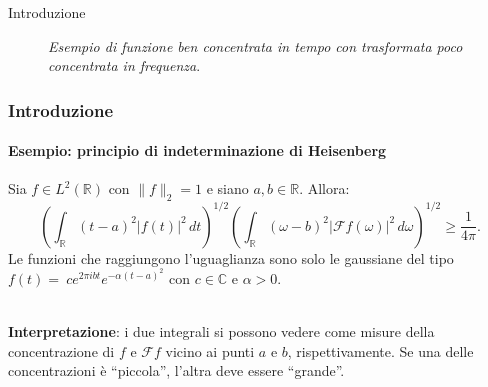 \documentclass[aspectratio=141]{beamer}
\newcommand{\R}{\mathbb{R}} %
\newcommand{\F}{\mathscr{F}} %
\newcommand{\C}{\mathbb{C}} %
\newcommand{\emptyline}{\phantom{ }\\}
\begin{document}
\begin{section}{Introduzione}
\begin{frame}
\begin{center}
\begin{figure}
{}
			\caption{ {\footnotesize \textit{Esempio di funzione ben concentrata in tempo con trasformata poco concentrata in frequenza}}.}
			\end{figure}
		\end{center}
	\end{frame}

	\begin{frame}
		\frametitle{Introduzione}
		\framesubtitle{Esempio: principio di indeterminazione di Heisenberg}
		\begin{myblock}
			Sia $f \in L^2(\R)$ con $\|f\|_2 = 1$ e siano $a,b \in \R$. Allora:
			\begin{equation}
				\left(\int_{\R} (t-a)^2 |f(t)|^2 \, dt\right)^{1/2} \left(\int_{\R} (\omega-b)^2 |\F f(\omega)|^2 \, d\omega	\right)^{1/2} \geq \dfrac{1}{4 \pi}.
			\end{equation}
			Le funzioni che raggiungono l'uguaglianza sono solo le gaussiane del tipo $f(t)=~c e^{2 \pi i b t} e^{-\alpha (t-a)^2}$ con $c \in \C$ e $\alpha > 0$.
		\end{myblock}
		\emptyline
		\textbf{Interpretazione}: i due integrali si possono vedere come misure della concentrazione di $f$ e $\F f$ vicino ai punti $a$ e $b$, rispettivamente. Se una delle concentrazioni è ``piccola'', l'altra deve essere ``grande''.\\
	\end{frame}
	
\end{section}
\end{document}
